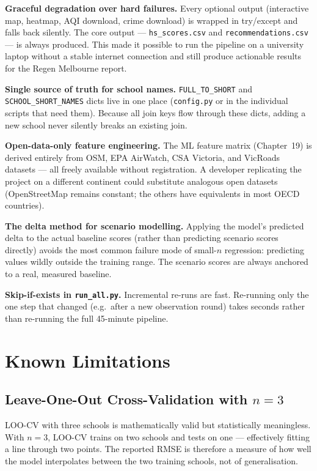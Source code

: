 \documentclass[11pt,a4paper,openany]{book}
\begin{document}
\textbf{Graceful degradation over hard failures.}  Every optional output (interactive
map, heatmap, AQI download, crime download) is wrapped in try/except and falls back
silently.  The core output --- \texttt{hs\_scores.csv} and
\texttt{recommendations.csv} --- is always produced.  This made it possible to run the
pipeline on a university laptop without a stable internet connection and still produce
actionable results for the Regen Melbourne report.

\textbf{Single source of truth for school names.}  \texttt{FULL\_TO\_SHORT} and
\texttt{SCHOOL\_SHORT\_NAMES} dicts live in one place (\texttt{config.py} or in the
individual scripts that need them).  Because all join keys flow through these dicts,
adding a new school never silently breaks an existing join.

\textbf{Open-data-only feature engineering.}  The ML feature matrix (Chapter~19) is
derived entirely from OSM, EPA AirWatch, CSA Victoria, and VicRoads datasets --- all
freely available without registration.  A developer replicating the project
on a different continent could substitute analogous open datasets (OpenStreetMap
remains constant; the others have equivalents in most OECD countries).

\textbf{The delta method for scenario modelling.}  Applying the model's predicted delta
to the actual baseline scores (rather than predicting scenario scores directly) avoids
the most common failure mode of small-$n$ regression: predicting values wildly outside
the training range.  The scenario scores are always anchored to a real, measured
baseline.

\textbf{Skip-if-exists in \texttt{run\_all.py}.}  Incremental re-runs are fast.
Re-running only the one step that changed (e.g.\ after a new observation round)
takes seconds rather than re-running the full 45-minute pipeline.

\section{Known Limitations}

\subsection{Leave-One-Out Cross-Validation with $n = 3$}

LOO-CV with three schools is mathematically valid but statistically meaningless.  With
$n = 3$, LOO-CV trains on two schools and tests on one --- effectively fitting a line
through two points.  The reported RMSE is therefore a measure of how well the model
interpolates between the two training schools, not of generalisation.
\end{document}
